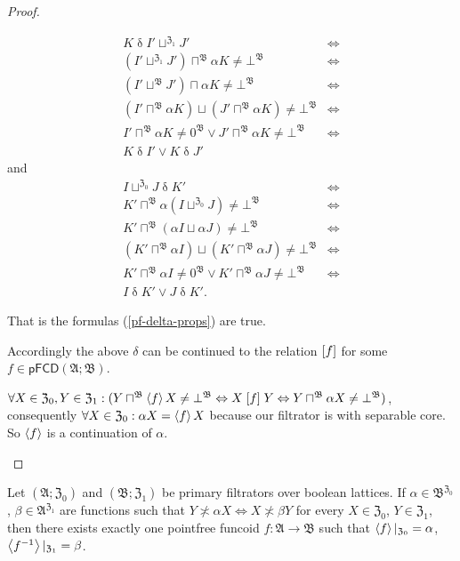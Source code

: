 \begin{proof}
\begin{widedisorder}
\begin{align*}
K\mathrel{\delta}I'\sqcup^{\mathfrak{Z}_{1}}J' & \Leftrightarrow\\
(I'\sqcup^{\mathfrak{Z}_{1}}J')\sqcap^{\mathfrak{B}}\alpha K\neq\bot^{\mathfrak{B}} & \Leftrightarrow\\
(I'\sqcup^{\mathfrak{B}}J')\sqcap\alpha K\neq\bot^{\mathfrak{B}} & \Leftrightarrow\\
(I'\sqcap^{\mathfrak{B}}\alpha K)\sqcup(J'\sqcap^{\mathfrak{B}}\alpha K)\neq\bot^{\mathfrak{B}} & \Leftrightarrow\\
I'\sqcap^{\mathfrak{B}}\alpha K\neq0^{\mathfrak{B}}\vee J'\sqcap^{\mathfrak{B}}\alpha K\neq\bot^{\mathfrak{B}} & \Leftrightarrow\\
K\mathrel{\delta}I'\vee K\mathrel{\delta}J'
\end{align*}
and
\begin{align*}
I\sqcup^{\mathfrak{Z}_{0}}J\mathrel{\delta}K' & \Leftrightarrow\\
K'\sqcap^{\mathfrak{B}}\alpha(I\sqcup^{\mathfrak{Z}_{0}}J)\neq\bot^{\mathfrak{B}} & \Leftrightarrow\\
K'\sqcap^{\mathfrak{B}}(\alpha I\sqcup\alpha J)\neq\bot^{\mathfrak{B}} & \Leftrightarrow\\
(K'\sqcap^{\mathfrak{B}}\alpha I)\sqcup(K'\sqcap^{\mathfrak{B}}\alpha J)\neq\bot^{\mathfrak{B}} & \Leftrightarrow\\
K'\sqcap^{\mathfrak{B}}\alpha I\neq0^{\mathfrak{B}}\vee K'\sqcap^{\mathfrak{B}}\alpha J\neq\bot^{\mathfrak{B}} & \Leftrightarrow\\
I\mathrel{\delta}K'\vee J\mathrel{\delta}K'.
\end{align*}



That is the formulas (\ref{pf-delta-props}) are true.


Accordingly the above $\delta$ can be continued to the relation $\mathrel{\left[f\right]}$
for some $f\in\mathsf{pFCD}(\mathfrak{A};\mathfrak{B})$.


$\forall X\in\mathfrak{Z}_{0},Y\in\mathfrak{Z}_{1}:(Y\sqcap^{\mathfrak{B}}\left\langle f\right\rangle X\neq\bot^{\mathfrak{B}}\Leftrightarrow X\mathrel{\left[f\right]}Y\Leftrightarrow Y\sqcap^{\mathfrak{B}}\alpha X\neq\bot^{\mathfrak{B}})$,
consequently $\forall X\in\mathfrak{Z}_{0}:\alpha X=\left\langle f\right\rangle X$ because
our filtrator is with separable core. So $\left\langle f\right\rangle$ is a continuation
of $\alpha$.

\end{widedisorder}
\end{proof}
\begin{thm}
Let $(\mathfrak{A};\mathfrak{Z}_{0})$ and $(\mathfrak{B};\mathfrak{Z}_{1})$
be primary filtrators over boolean lattices. If $\alpha\in\mathfrak{B}^{\mathfrak{Z}_{0}}$,
$\beta\in\mathfrak{A}^{\mathfrak{Z}_{1}}$ are functions such that
$Y\nasymp\alpha X\Leftrightarrow X\nasymp\beta Y$ for every $X\in\mathfrak{Z}_{0}$,
$Y\in\mathfrak{Z}_{1}$, then there exists exactly one pointfree funcoid $f:\mathfrak{A}\rightarrow\mathfrak{B}$
such that $\left\langle f\right\rangle|_{\mathfrak{Z}_0}=\alpha$, $\left\langle f^{-1}\right\rangle|_{\mathfrak{Z}_1}=\beta$.\end{thm}
